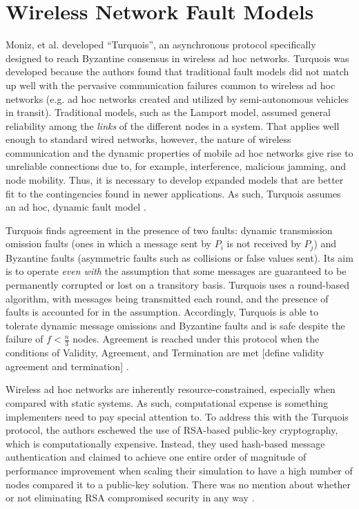 \documentclass[twoside, conference]{IEEEtran}%
\begin{document}
\section{Wireless Network Fault Models}\label{sec:wireless-faultmodels}
Moniz, et al. developed ``Turquois'', an asynchronous protocol specifically designed to reach Byzantine consensus in wireless ad hoc networks. Turquois was developed because the authors found that traditional fault models did not match up well with the pervasive communication failures common to wireless ad hoc networks (e.g. ad hoc networks created and utilized by semi-autonomous vehicles in transit). Traditional models, such as the Lamport model, assumed general reliability among the \textit{links} of the different nodes in a system. That applies well enough to standard wired networks, however, the nature of wireless communication and the dynamic properties of mobile ad hoc networks give rise to unreliable connections due to, for example, interference, malicious jamming, and node mobility. Thus, it is necessary to develop expanded models that are better fit to the contingencies found in newer applications. As such, Turquois assumes an ad hoc, dynamic fault model \cite{Moniz2013}.

Turquois finds agreement in the presence of two faults: dynamic transmission omission faults (ones in which a message sent by $P_i$ is not received by $P_j$) and Byzantine faults (asymmetric faults such as collisions or false values sent). Its aim is to operate \textit{even with} the assumption that some messages are guaranteed to be permanently corrupted or lost on a transitory basis. Turquois uses a  round-based algorithm, with messages being transmitted each round, and the presence of faults is accounted for in the assumption. Accordingly, Turquois is able to tolerate dynamic message omissions and Byzantine faults and is safe despite the failure of $f < \frac{n}{3}$ nodes. Agreement is reached under this protocol when the conditions of Validity, Agreement, and Termination are met [define validity agreement and termination] \cite{Moniz2013}.

Wireless ad hoc networks are inherently resource-constrained, especially when compared with static systems. As such, computational expense is something implementers need to pay special attention to. To address this with the Turquois protocol, the authors eschewed the use of RSA-based public-key cryptography, which is computationally expensive. Instead, they used hash-based message authentication and claimed to achieve one entire order of magnitude of performance improvement when scaling their simulation to have a high number of nodes compared it to a public-key solution. There was no mention about whether or not eliminating RSA compromised security in any way \cite{Moniz2013}.
\end{document}
